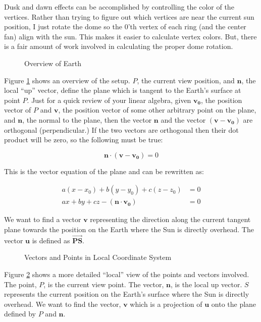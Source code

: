 \documentclass[12pt]{article}
\begin{document}
Dusk and dawn effects can be accomplished by controlling the color of
the vertices.  Rather than trying to figure out which vertices are
near the current sun position, I just rotate the dome so the 0'th
vertex of each ring (and the center fan) align with the sun.  This
makes it easier to calculate vertex colors.  But, there is a fair
amount of work involved in calculating the proper dome rotation.

\begin{figure}[hbt]
  \centerline{                   
  }
  \caption{Overview of Earth}
  \label{fig:earth}
\end{figure}

Figure \ref{fig:earth} shows an overview of the setup.  $P$, the
current view position, and $\mathbf{n}$, the local ``up'' vector,
define the plane which is tangent to the Earth's surface at point $P$.
Just for a quick review of your linear algebra, given $\mathbf{v_0}$,
the position vector of $P$ and $\mathbf{v}$, the position vector of
some other arbitrary point on the plane, and $\mathbf{n}$, the normal
to the plane, then the vector $\mathbf{n}$ and the vector $(\mathbf{v}
- \mathbf{v_0})$ are orthogonal (perpendicular.)  If the two vectors
are orthogonal then their dot product will be zero, so the following
must be true:

\begin{equation}
  \mathbf{n} \cdot ( \mathbf{v} - \mathbf{v_0} ) = 0
\end{equation}

This is the vector equation of the plane and can be rewritten as:

\begin{align}
  a(x - x_0) + b(y - y_0) + c(z - z_0) &= 0 \\
  ax + by + cz - (\mathbf{n} \cdot \mathbf{v_0}) &= 0
\end{align}

We want to find a vector $\mathbf{v}$ representing the
direction along the current tangent plane towards the position on the
Earth where the Sun is directly overhead.  The vector $\mathbf{u}$ is
defined as $\vec{\mathbf{PS}}$.

\begin{figure}[hbt]
  \centerline{                   
  }
  \caption{Vectors and Points in Local Coordinate System}
  \label{fig:local}
\end{figure}

Figure \ref{fig:local} shows a more detailed ``local'' view of the
points and vectors involved.  The point, $P$, is the current view
point.  The vector, $\mathbf{n}$, is the local up vector.  $S$
represents the current position on the Earth's surface where the Sun
is directly overhead.  We want to find the vector, $\mathbf{v}$ which
is a projection of $\mathbf{u}$ onto the plane defined by $P$ and
$\mathbf{n}$.
\end{document}
